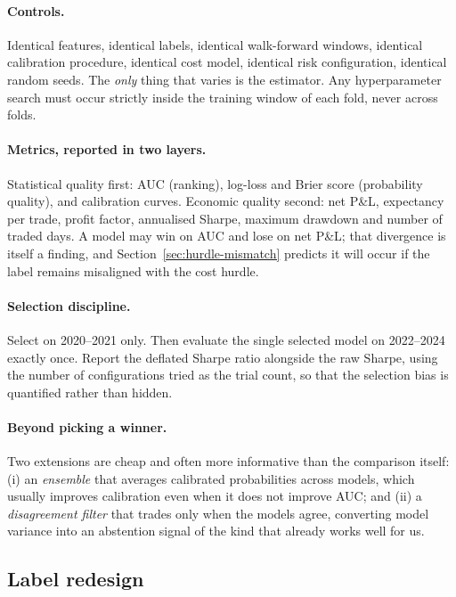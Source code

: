 \documentclass[11pt,a4paper]{article}
\begin{document}
\paragraph{Controls.} Identical features, identical labels, identical walk-forward
windows, identical calibration procedure, identical cost model, identical risk
configuration, identical random seeds. The \emph{only} thing that varies is the
estimator. Any hyperparameter search must occur strictly inside the training window of
each fold, never across folds.

\paragraph{Metrics, reported in two layers.} Statistical quality first: AUC (ranking),
log-loss and Brier score (probability quality), and calibration curves. Economic quality
second: net P\&L, expectancy per trade, profit factor, annualised Sharpe, maximum
drawdown and number of traded days. A model may win on AUC and lose on net P\&L; that
divergence is itself a finding, and Section~\ref{sec:hurdle-mismatch} predicts it will
occur if the label remains misaligned with the cost hurdle.

\paragraph{Selection discipline.} Select on 2020--2021 only. Then evaluate the single
selected model on 2022--2024 exactly once. Report the deflated Sharpe ratio
\cite{deflatedsharpe} alongside the raw Sharpe, using the number of configurations tried
as the trial count, so that the selection bias is quantified rather than hidden.

\paragraph{Beyond picking a winner.} Two extensions are cheap and often more informative
than the comparison itself: (i) an \emph{ensemble} that averages calibrated
probabilities across models, which usually improves calibration even when it does not
improve AUC; and (ii) a \emph{disagreement filter} that trades only when the models
agree, converting model variance into an abstention signal of the kind that already
works well for us.

\subsection{Label redesign}
\end{document}
